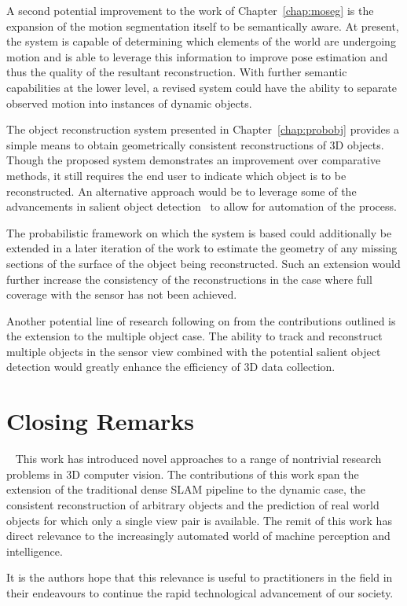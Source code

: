 A second potential improvement to the work of Chapter~\ref{chap:moseg} is the expansion of the 
motion segmentation itself to be semantically aware. At present, the system is capable of 
determining which elements of the world are undergoing motion and is able to leverage this 
information to improve pose estimation and thus the quality of the resultant reconstruction. 
With further semantic capabilities at the lower level, a revised system could have the ability 
to separate observed motion into instances of dynamic objects.

The object reconstruction system presented in Chapter~\ref{chap:probobj} provides a simple means 
to obtain geometrically consistent reconstructions of 3D objects. Though the proposed system
demonstrates an improvement over comparative methods, it still requires the end user to indicate 
which object is to be reconstructed. An alternative approach would be to leverage some of the 
advancements in salient object detection~\cite{Borji2014} to allow for automation of the process.

The probabilistic framework on which the system is based could additionally be extended in a later 
iteration of the work to estimate the geometry of any missing sections of the surface of the object 
being reconstructed. Such an extension would further increase the consistency of the reconstructions 
in the case where full coverage with the sensor has not been achieved.

Another potential line of research following on from the contributions outlined is the extension to 
the multiple object case. The ability to track and reconstruct multiple objects in the sensor view 
combined with the potential salient object detection would greatly enhance the efficiency of 3D data 
collection.

\section{Closing Remarks}
~\label{sec:discussion_conclusions}
This work has introduced novel approaches to a range of nontrivial research problems in 3D computer 
vision. The contributions of this work span the extension of the traditional dense SLAM pipeline to 
the dynamic case, the consistent reconstruction of arbitrary objects and the prediction of real world 
objects for which only a single view pair is available. The remit of this work has direct relevance to 
the increasingly automated world of machine perception and intelligence.

It is the authors hope that this relevance is useful to practitioners in the field in their endeavours 
to continue the rapid technological advancement of our society.
